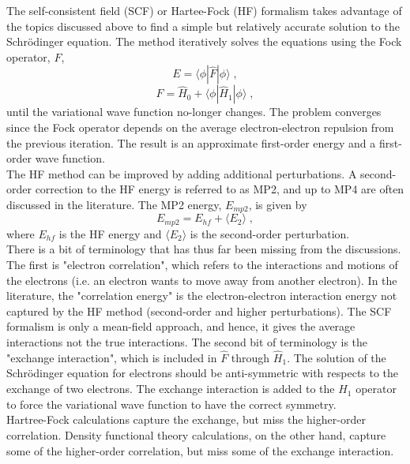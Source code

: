 \documentclass[12pt]{report}
\begin{document}
The self-consistent field (SCF) or Hartee-Fock (HF) formalism takes advantage
of the topics discussed above to find a simple but relatively accurate
solution to the Schr\"{o}dinger equation. The method iteratively solves the
equations using the Fock operator, $F$,
\begin{equation}
 E = \langle\phi|\hat F|\phi\rangle \; ,
\end{equation}
\begin{equation}
 \hat F = \hat H_0+\langle\phi|\hat H_1|\phi\rangle \; ,
\end{equation}
until the variational wave function no-longer changes. The problem converges
since the Fock operator depends on the average electron-electron repulsion
from the previous iteration. The result is an approximate first-order energy
and a first-order wave function. \\

The HF method can be improved by adding additional perturbations. A
second-order correction to the HF energy is referred to as MP2, and up to
MP4 are often discussed in the literature. The MP2 energy, $E_{mp2}$, is
given by
\begin{equation}
 E_{mp2} = E_{hf} + \langle E_{2} \rangle \; ,
\end{equation}
where $E_{hf}$ is the HF energy and $\langle E_2 \rangle$ is the second-order
perturbation. \\

There is a bit of terminology that has thus far been missing from the
discussions. The first is "electron correlation", which refers to the
interactions and motions of the electrons (i.e. an electron wants to move away
from another electron). In the literature, the "correlation energy" is
the electron-electron interaction energy not captured by the HF method
(second-order and higher perturbations). The SCF formalism is only a
mean-field approach, and hence, it gives the average interactions not the true
interactions. The second bit of terminology is the "exchange interaction",
which is included in $\hat F$ through $\hat H_1$. The solution of the
Schr\"{o}dinger equation for electrons should be anti-symmetric with respects
to the exchange of two electrons. The exchange interaction is added to the
$\hat H_1$ operator to force the variational wave function to have the correct
symmetry. \\

Hartree-Fock calculations capture the exchange, but miss the higher-order
correlation. Density functional theory calculations, on the other hand,
capture some of the higher-order correlation, but miss some of the exchange
interaction.
\end{document}
